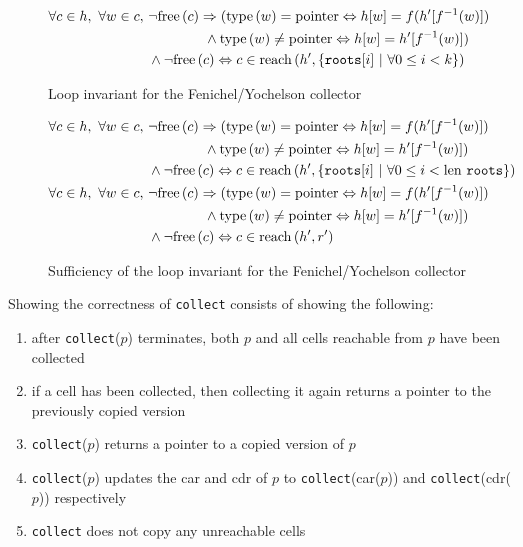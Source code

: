 \begin{figure}[t]
  \centering
  \begin{align*}
    \forall c \in h,\ \forall w \in c,\ &\lnot\mathrm{free}\left(c\right) \Rightarrow
    (\mathrm{type}\left(w\right) = \mathrm{pointer} \Leftrightarrow h[w] = f(h'[f^{-1}(w)])\\
    &\quad\quad\quad\quad \land \mathrm{type}\left(w\right) \neq \mathrm{pointer}
    \Leftrightarrow h[w] = h'[f^{-1}(w)])\\
    &\land \lnot\mathrm{free}\left(c\right) \Leftrightarrow c \in
    \mathrm{reach}\left(h', \{\mathtt{roots}[i]~|~\forall 0 \leq i < k\}\right)
  \end{align*}
  \captionsetup{format=default}
  \caption{Loop invariant for the Fenichel/Yochelson collector}
  \label{fig:copying-example-partial-invariant}
\end{figure}

\begin{figure}[t]
  \centering
  \begin{align*}
    \forall c \in h,\ \forall w \in c,\ &\lnot\free{c} \implies
    (\type{w} = \typointer \iff h[w] = f(h'[f^{-1}(w)])\\
    &\quad\quad\quad\quad \land \type{w} \neq \typointer
    \iff h[w] = h'[f^{-1}(w)])\\
    &\land \lnot\free{c} \iff c \in \reach{h'}{\{\mathtt{roots}[i]~|~\forall
      0 \leq i < \len\mathtt{roots}\}}\\
%
    \forall c \in h,\ \forall w \in c,\ &\lnot\free{c} \implies
    (\type{w} = \typointer \iff h[w] = f(h'[f^{-1}(w)])\\
    &\quad\quad\quad\quad \land \type{w} \neq \typointer
    \iff h[w] = h'[f^{-1}(w)])\\
    &\land \lnot\free{c} \iff c \in \reach{h'}{r'}
  \end{align*}
  \caption{Sufficiency of the loop invariant for the
    Fenichel/Yochelson collector}
  \label{fig:copying-example-partial-sufficient}
\end{figure}

\begin{theorem}
\label{lem:fyc}
  Showing the correctness of \texttt{collect} consists of showing the
  following:

  \begin{enumerate}
  \item after \texttt{collect}($p$) terminates, both $p$ and all cells
    reachable from $p$ have been collected

  \item if a cell has been collected, then collecting it again returns
    a pointer to the previously copied version

  \item \texttt{collect}($p$) returns a pointer to a copied version of
    $p$

  \item \texttt{collect}($p$) updates the car and cdr of $p$ to
    \texttt{collect}(car($p$)) and \texttt{collect}(cdr($p$))
    respectively

  \item \texttt{collect} does not copy any unreachable cells
  \end{enumerate}
\end{theorem}

